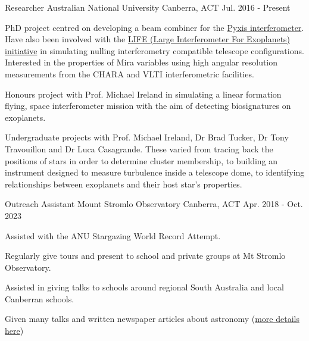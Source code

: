 
\begin{cventries}

  \cventry
    {Researcher} %
    {Australian National University} %
    {Canberra, ACT} %
    {Jul. 2016 - Present} %
    {
      \begin{cvitems} %
        \item {PhD project centred on developing a beam combiner for the \href{https://www.mso.anu.edu.au/pyxis}{Pyxis interferometer}. Have also been involved with the \href{https://www.life-space-mission.com}{LIFE (Large Interferometer For Exoplanets) initiative} in simulating nulling interferometry compatible telescope configurations. Interested in the properties of Mira variables using high angular resolution measurements from the CHARA and VLTI interferometric facilities.}
        \item {Honours project with Prof. Michael Ireland in simulating a linear formation flying, space interferometer mission with the aim of detecting biosignatures on exoplanets.}
        \item {Undergraduate projects with Prof. Michael Ireland, Dr Brad Tucker, Dr Tony Travouillon and Dr Luca Casagrande. These varied from tracing back the positions of stars in order to determine cluster membership, to building an instrument designed to measure turbulence inside a telescope dome, to identifying relationships between exoplanets and their host star's properties.}
      \end{cvitems}
    }

  \cventry
    {Outreach Assistant} %
    {Mount Stromlo Observatory} %
    {Canberra, ACT} %
    {Apr. 2018 - Oct. 2023} %
    {
      \begin{cvitems} %
        \item {Assisted with the ANU Stargazing World Record Attempt.}
        \item {Regularly give tours and present to school and private groups at Mt Stromlo Observatory.}
        \item {Assisted in giving talks to schools around regional South Australia and local Canberran schools.}
        \item {Given many talks and written newspaper articles about astronomy (\href{https://www.mso.anu.edu.au/~jhansen/\#outreach}{more details here})}
      \end{cvitems}
    }
    


\end{cventries}
